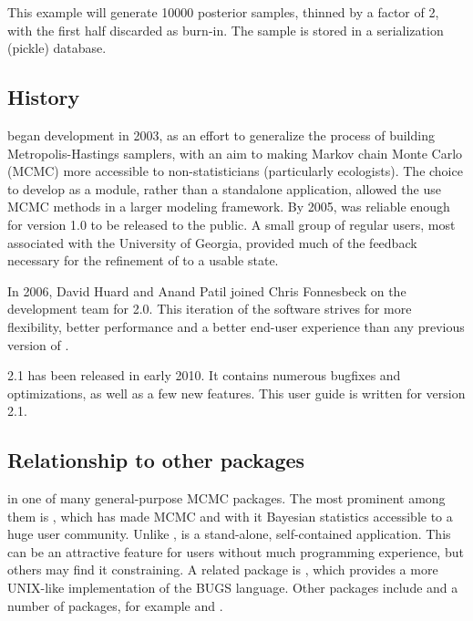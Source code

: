 \documentclass[]{jss}
\begin{document}
This example will generate 10000 posterior samples, thinned by a factor of 2, with the first half discarded as burn-in. The sample is stored in a  serialization (pickle) database.



\subsection{History}
  \label{history}


 began development in 2003, as an effort to generalize the process of building Metropolis-Hastings samplers, with an aim to making Markov chain Monte Carlo (MCMC) more accessible to non-statisticians (particularly ecologists). The choice to develop  as a  module, rather than a standalone application, allowed the use MCMC methods in a larger modeling framework. By 2005,  was reliable enough for version 1.0 to be released to the public. A small group of regular users, most associated with the University of Georgia, provided much of the feedback necessary for the refinement of  to a usable state.

In 2006, David Huard and Anand Patil joined Chris Fonnesbeck on the development team for  2.0. This iteration of the software strives for more flexibility, better performance and a better end-user experience than any previous version of .

 2.1 has been released in early 2010. It contains numerous bugfixes and optimizations, as well as a few new features. This user guide is written for version 2.1.



\subsection{Relationship to other packages}
  \label{relationship-to-other-packages}%


 in one of many general-purpose MCMC packages. The most prominent among them is  \citep{winbugs}, which has made MCMC and with it Bayesian statistics accessible to a huge user community. Unlike ,  is a stand-alone, self-contained application. This can be an attractive feature for users without much programming experience, but others may find it constraining. A related package is  \citep{jags}, which provides a more UNIX-like implementation of the BUGS language. Other packages include  \citep{hbc} and a number of  \citep{r}  packages, for example  \citep{mcmcglmm} and  \citep{mcmcpack}.
\end{document}
